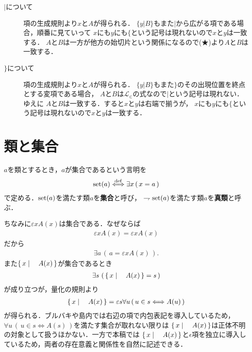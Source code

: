 \begin{description}
		\item[$|$について]
			項の生成規則より$x$と$A$が得られる．
			$\{y|B\}$もまた$|$から広がる項である場合，順番に見ていって
			$x$にも$y$にも$\{$という記号は現れないので$x$と$y$は一致する．
			$A$と$B$は一方が他方の始切片という関係になるので(★)より$A$と$B$は一致する．
			
		\item[$\}$について]
			項の生成規則より$x$と$A$が得られる．
			$\{y|B\}$もまた$\}$のその出現位置を終点とする変項である場合，
			$A$と$B$は$\mathcal{L}_{\in}$の式なので$|$という記号は現れない．ゆえに
			$A$と$B$は一致する．すると$x$と$y$は右端で揃うが，
			$x$にも$y$にも$\{$という記号は現れないので$x$と$y$は一致する．
	\end{description}
	
\section{類と集合}
	\begin{screen}
		\begin{dfn}[類と集合]
			$a$を類とするとき，$a$が集合であるという言明を
			\begin{align}
				\operatorname*{set} (a) \overset{\mathrm{def}}{\Longleftrightarrow} \exists x\, (\, x = a\, )
			\end{align}
			で定める．$\operatorname*{set} (a)$を満たす類$a$を{\bf 集合}と呼び，
			$\rightharpoondown \operatorname*{set} (a)$を満たす類$a$を{\bf 真類}と呼ぶ．
		\end{dfn}
	\end{screen}
	
	ちなみに$\varepsilon x A(x)$は集合である．なぜならば
	\begin{align}
		\varepsilon x A(x) = \varepsilon x A(x)
	\end{align}
	だから
	\begin{align}
		\exists a\, \left(\, a = \varepsilon x A(x)\, \right).
	\end{align}
	また$\left\{\, x \mid \quad A(x)\, \right\}$が集合であるとき
	\begin{align}
		\exists s\, \left(\, \left\{\, x \mid \quad A(x)\, \right\} = s\, \right)
	\end{align}
	が成り立つが，量化の規則より
	\begin{align}
		\left\{\, x \mid \quad A(x)\, \right\} = \varepsilon s \forall u\, (\, u \in s \Longleftrightarrow A(u)\, )
	\end{align}
	が得られる．ブルバキや島内では右辺の項で内包表記を導入しているため，
	$\forall u\, (\, u \in s \Longleftrightarrow A(s)\, )$を満たす集合が取れない限りは
	$\left\{\, x \mid \quad A(x)\, \right\}$は正体不明の対象として扱うほかない．一方で本稿では
	$\left\{\, x \mid \quad A(x)\, \right\}$と$\epsilon$項を独立に導入しているため，両者の存在意義と関係性を自然に記述できる．
	
